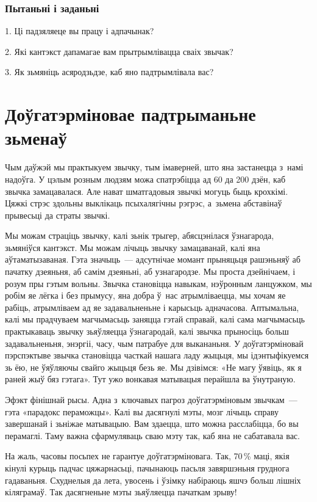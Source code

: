 \subsubsection{Пытаньні і заданьні}

1. Ці падзяляеце вы працу і адпачынак?

2. Які кантэкст дапамагае вам прытрымлівацца сваіх звычак?

3. Як зьмяніць асяродзьдзе, каб яно падтрымлівала вас?


\section{Доўгатэрміновае падтрыманьне зьменаў}

Чым даўжэй мы практыкуем звычку, тым імаверней, што яна застанецца з~намі надоўга. У цэлым розным людзям можа спатрэбіцца ад 60 да 200 дзён, каб звычка замацавалася. Але нават шматгадовыя звычкі могуць быць крохкімі. Цяжкі стрэс здольны выклікаць псыхалягічны рэгрэс, а~зьмена абставінаў прывесьці да страты звычкі. 

Мы можам страціць звычку, калі зьнік трыгер, абясцэнілася ўзнагарода, зьмяніўся кантэкст. Мы можам лічыць звычку замацаванай, калі яна аўтаматызаваная. Гэта значыць~--- адсутнічае момант прыняцьця рашэньняў аб пачатку дзеяньня, аб самім дзеяньні, аб узнагародзе. Мы проста дзейнічаем, і розум пры гэтым вольны. Звычка становіцца навыкам, нэўронным ланцужком, мы робім яе лёгка і без прымусу, яна добра ў~нас атрымліваецца, мы хочам яе рабіць, атрымліваем ад яе задавальненьне і карысьць адначасова. Аптымальна, калі мы прадчуваем магчымасьць заняцца гэтай справай, калі сама магчымасьць практыкаваць звычку зьяўляецца ўзнагародай, калі звычка прыносіць больш задавальненьня, энэргіі, часу, чым патрабуе для выкананьня. У доўгатэрміновай пэрспэктыве звычка становіцца часткай нашага ладу жыцьця, мы ідэнтыфікуемся зь ёю, не ўяўляючы свайго жыцьця безь яе. Мы дзівімся: «Не магу ўявіць, як я раней жыў бяз гэтага». Тут ужо вонкавая матывацыя перайшла ва ўнутраную.

Эфэкт фінішнай рысы. Адна з~ключавых пагроз доўгатэрміновым звычкам~--- гэта «парадокс пераможцы». Калі вы дасягнулі мэты, мозг лічыць справу завершанай і зьніжае матывацыю. Вам здаецца, што можна расслабіцца, бо вы перамаглі. Таму важна сфармуляваць сваю мэту так, каб яна не сабатавала вас.

На жаль, часовы посьпех не гарантуе доўгатэрміновага. Так, 70\,\% маці, якія кінулі курыць падчас цяжарнасьці, пачынаюць пасьля завяршэньня груднога гадаваньня. Схуднелыя да лета, увосень і ўзімку набіраюць яшчэ больш лішніх кіляграмаў. Так дасягненьне мэты зьяўляецца пачаткам зрыву!

